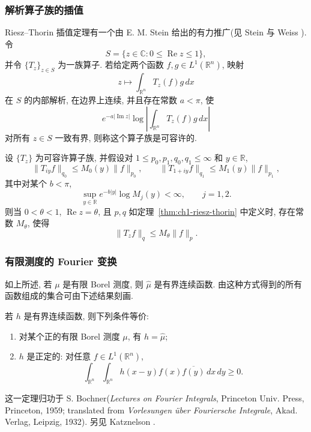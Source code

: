 \subsubsection{解析算子族的插值}
\label{subsec:ch1-analytic-family-interpolation}

Riesz--Thorin 插值定理有一个由 E. M. Stein 给出的有力推广(见 Stein 与 Weiss ). 令
\[
 S=\{z\in\mathbb C:0\le\operatorname{Re}z\le1\},
\]
并令 $\{T_z\}_{z\in S}$ 为一族算子. 若给定两个函数 $f,g\in L^1(\mathbb R^n)$, 映射
\[
 z\longmapsto\int_{\mathbb R^n}T_z(f)g\,dx
\]
在 $S$ 的内部解析, 在边界上连续, 并且存在常数 $a<\pi$, 使
\[
 e^{-a|\operatorname{Im}z|}
 \log\left|\int_{\mathbb R^n}T_z(f)g\,dx\right|
\]
对所有 $z\in S$ 一致有界, 则称这个算子族是可容许的.

\hypertarget{chapter-01-page-035}{}
\begin{Theorem}
\label{thm:ch1-stein-interpolation}
设 $\{T_z\}$ 为可容许算子族, 并假设对 $1\le p_0,p_1,q_0,q_1\le\infty$ 和 $y\in\mathbb R$,
\[
 \|T_{iy}f\|_{q_0}\le M_0(y)\|f\|_{p_0},
 \qquad
 \|T_{1+iy}f\|_{q_1}\le M_1(y)\|f\|_{p_1},
\]
其中对某个 $b<\pi$,
\[
 \sup_{y\in\mathbb R}e^{-b|y|}\log M_j(y)<\infty,
 \qquad j=1,2.
\]
则当 $0<\theta<1$, $\operatorname{Re}z=\theta$, 且 $p,q$ 如定理~\ref{thm:ch1-riesz-thorin} 中定义时, 存在常数 $M_\theta$, 使得
\[
 \|T_zf\|_q\le M_\theta\|f\|_p.
\]
\end{Theorem}

\subsubsection{有限测度的 Fourier 变换}
\label{subsec:ch1-finite-measure-fourier-transforms}

如上所述, 若 $\mu$ 是有限 Borel 测度, 则 $\widehat\mu$ 是有界连续函数. 由这种方式得到的所有函数组成的集合可由下述结果刻画.

\begin{Theorem}
\label{thm:ch1-bochner}
若 $h$ 是有界连续函数, 则下列条件等价:
\begin{enumerate}[label=(\arabic*)]
\item 对某个正的有限 Borel 测度 $\mu$, 有 $h=\widehat\mu$;
\item $h$ 是正定的: 对任意 $f\in L^1(\mathbb R^n)$,
\[
 \int_{\mathbb R^n}\int_{\mathbb R^n}
 h(x-y)f(x)\overline{f(y)}\,dx\,dy\ge0.
\]
\end{enumerate}
\end{Theorem}

这一定理归功于 S. Bochner(\emph{Lectures on Fourier Integrals}, Princeton Univ. Press, Princeton, 1959; translated from \emph{Vorlesungen über Fouriersche Integrale}, Akad. Verlag, Leipzig, 1932). 另见 Katznelson .

